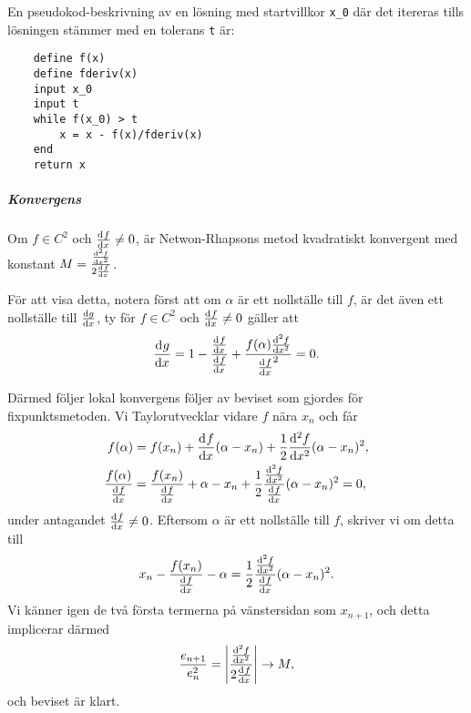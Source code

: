 En pseudokod-beskrivning av en lösning med startvillkor \verb|x_0| där det itereras tills lösningen stämmer med en tolerans \verb|t| är:
\begin{lstlisting}
	define f(x)
	define fderiv(x)
	input x_0
	input t
	while f(x_0) > t
		x = x - f(x)/fderiv(x)
	end
	return x
\end{lstlisting}

\subparagraph{Konvergens}
Om $f\in C^{2}$ och $\dv[]{f}{x} (\alpha) \neq 0$, är Netwon-Rhapsons metod kvadratiskt konvergent med konstant $M = \frac{\dv[2]{f}{x} (\alpha)}{2\dv[]{f}{x} (\alpha)}$.

För att visa detta, notera först att om $\alpha$ är ett nollställe till $f$, är det även ett nollställe till $\dv{g}{x}$, ty för $f\in C^{2}$ och $\dv[]{f}{x} (\alpha) \neq 0$ gäller att
\begin{align*}
	\dv[]{g}{x} (\alpha) = 1 - \frac{\dv[]{f}{x} (\alpha)}{\dv[]{f}{x} (\alpha)} + \frac{f(\alpha)\dv[2]{f}{x} (\alpha)}{\dv[]{f}{x} (\alpha)^{2}} = 0.
\end{align*}

Därmed följer lokal konvergens följer av beviset som gjordes för fixpunktsmetoden. Vi Taylorutvecklar vidare $f$ nära $x_{n}$ och får
\begin{align*}
	f(\alpha)                            &= f(x_{n}) + \dv[]{f}{x} (x_{n})(\alpha - x_{n}) + \frac{1}{2}\dv[2]{f}{x} (c_{n})(\alpha - x_{n})^{2}, \\
	\frac{f(\alpha)}{\dv[]{f}{x} (x_{n})} &= \frac{f(x_{n})}{\dv[]{f}{x} (x_{n})} + \alpha - x_{n} + \frac{1}{2}\frac{\dv[2]{f}{x} (c_{n})}{\dv[]{f}{x} (x_{n})}(\alpha - x_{n})^{2} = 0,
\end{align*}
under antagandet $\dv[]{f}{x} (x_{n}) \neq 0$. Eftersom $\alpha$ är ett nollställe till $f$, skriver vi om detta till
\begin{align*}
	x_{n} - \frac{f(x_{n})}{\dv[]{f}{x} (x_{n})} - \alpha = \frac{1}{2}\frac{\dv[2]{f}{x} (c_{n})}{\dv[]{f}{x} (x_{n})}(\alpha - x_{n})^{2}.
\end{align*}
Vi känner igen de två första termerna på vänstersidan som $x_{n + 1}$, och detta implicerar därmed
\begin{align*}
	\frac{e_{n + 1}}{e_{n}^{2}} = \abs{\frac{\dv[2]{f}{x} (c_{n})}{2\dv[]{f}{x} (x_{n})}} \to M,
\end{align*}
och beviset är klart.

